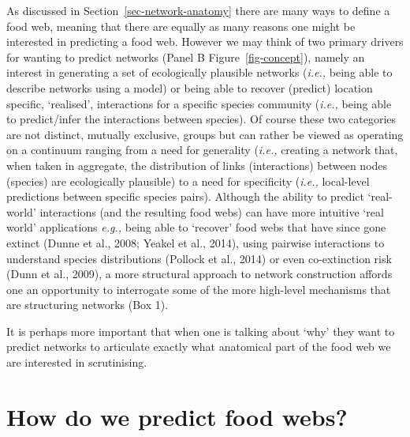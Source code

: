\documentclass[
]{article}
\begin{document}
As discussed in Section~\ref{sec-network-anatomy} there are many ways to
define a food web, meaning that there are equally as many reasons one
might be interested in predicting a food web. However we may think of
two primary drivers for wanting to predict networks (Panel B
Figure~\ref{fig-concept}), namely an interest in generating a set of
ecologically plausible networks (\emph{i.e.,} being able to describe
networks using a model) or being able to recover (predict) location
specific, `realised', interactions for a specific species community
(\emph{i.e.,} being able to predict/infer the interactions between
species). Of course these two categories are not distinct, mutually
exclusive, groups but can rather be viewed as operating on a continuum
ranging from a need for generality (\emph{i.e.,} creating a network
that, when taken in aggregate, the distribution of links (interactions)
between nodes (species) are ecologically plausible) to a need for
specificity (\emph{i.e.,} local-level predictions between specific
species pairs). Although the ability to predict `real-world'
interactions (and the resulting food webs) can have more intuitive `real
world' applications \emph{e.g.,} being able to `recover' food webs that
have since gone extinct (Dunne et al., 2008; Yeakel et al., 2014), using
pairwise interactions to understand species distributions (Pollock et
al., 2014) or even co-extinction risk (Dunn et al., 2009), a more
structural approach to network construction affords one an opportunity
to interrogate some of the more high-level mechanisms that are
structuring networks (Box 1).

It is perhaps more important that when one is talking about `why' they
want to predict networks to articulate exactly what anatomical part of
the food web we are interested in scrutinising.

\section{How do we predict food webs?}\label{sec-network-build}
\end{document}
